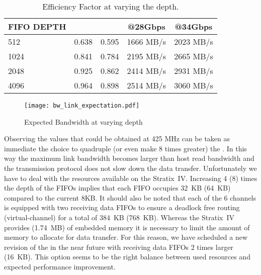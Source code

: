 \begin{table}[!hbt]
\centering
\setlength\extrarowheight{2pt}
\begin{tabular}{|l|cccc|}
\hline
\hline
FIFO DEPTH &  &  & @28Gbps & @34Gbps  \\
\hline
512        & 0.638   & 0.595   & 1666 MB/s  & 2023 MB/s     \\
1024       & 0.841   & 0.784   & 2195 MB/s  & 2665 MB/s     \\
2048       & 0.925   & 0.862   & 2414 MB/s  & 2931 MB/s     \\
4096       & 0.964   & 0.898   & 2514 MB/s  & 3060 MB/s     \\
\hline
\hline
\end{tabular}
\caption{Efficiency Factor at varying the  depth.}
\label{tab:efficiency}
\end{table} 


\begin{figure}[!hbt]
  \centering
  \texttt{[image: bw\_link\_expectation.pdf]}
  \caption{Expected Bandwidth at varying  depth}
  \label{fig:link_expectation}
\end{figure}


Observing the values that could be obtained at 425 MHz can be taken as
immediate the choice to quadruple (or even make 8 times greater) the
. In this way the maximum link bandwidth becomes
larger than host read bandwidth and the transmission protocol does not
slow down the data transfer.
Unfortunately we have to deal with the resources available on the
Stratix~IV.  Increasing 4 (8) times the depth of the FIFOs implies
that each FIFO occupies 32~KB (64~KB) compared to the current 8KB. It
should also be noted that each of the 6 channels is equipped with two
receiving data FIFOs to ensure a deadlock free routing
(virtual-channel) for a total of 384~KB (768~KB). Whereas the
Stratix~IV provides (1.74~MB) of embedded memory it is necessary to
limit the amount of memory to allocate for data transfer.
For this reason, we have scheduled a new revision of the  in the near future with receiving data FIFOs 2 times larger
(16~KB).  This option seems to be the right balance between used
resources and expected performance improvement.

